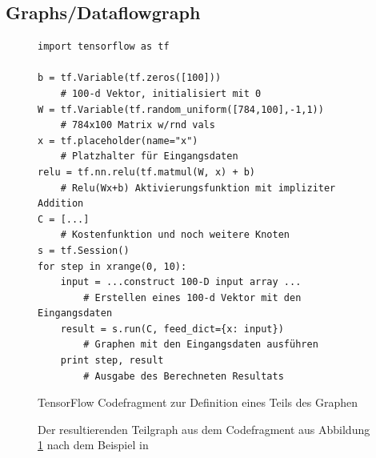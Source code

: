 \subsection{Graphs/Dataflowgraph}

\begin{figure}
\lstset{language=Python}
\begin{lstlisting}
import tensorflow as tf

b = tf.Variable(tf.zeros([100])) 
	# 100-d Vektor, initialisiert mit 0
W = tf.Variable(tf.random_uniform([784,100],-1,1)) 
	# 784x100 Matrix w/rnd vals
x = tf.placeholder(name="x") 
	# Platzhalter für Eingangsdaten
relu = tf.nn.relu(tf.matmul(W, x) + b) 
	# Relu(Wx+b) Aktivierungsfunktion mit impliziter Addition
C = [...] 
	# Kostenfunktion und noch weitere Knoten
s = tf.Session()
for step in xrange(0, 10):
	input = ...construct 100-D input array ... 
		# Erstellen eines 100-d Vektor mit den Eingangsdaten
	result = s.run(C, feed_dict={x: input}) 
		# Graphen mit den Eingangsdaten ausführen
	print step, result 
		# Ausgabe des Berechneten Resultats
\end{lstlisting}

	\caption{TensorFlow Codefragment zur Definition eines Teils des Graphen}
	\label{fig:SimpleFragmentGraphDefinition}
\end{figure}
\begin{figure}
	\centering


	\caption{Der resultierenden Teilgraph aus dem Codefragment aus Abbildung \ref{fig:SimpleFragmentGraphDefinition} nach dem Beispiel in \cite{wp2015tensorflow}}
	\label{fig:SimpleFragmentGraphPic}
\end{figure}
